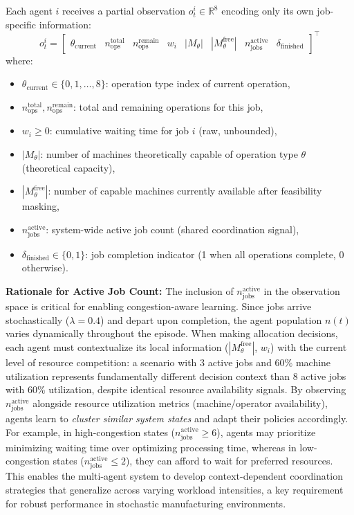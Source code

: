 Each agent \( i \) receives a partial observation \( o_t^i \in \mathbb{R}^8 \) encoding only its own job-specific information:
\begin{equation}
o_t^i = \begin{bmatrix}
\theta_{\text{current}} & n_{\text{ops}}^{\text{total}} & n_{\text{ops}}^{\text{remain}} & w_i & |M_\theta| & |M_{\theta}^{\text{free}}| & n_{\text{jobs}}^{\text{active}} & \delta_{\text{finished}}
\end{bmatrix}^\top
\end{equation}
where:
\begin{itemize}
    \item \( \theta_{\text{current}} \in \{0, 1, \ldots, 8\} \): operation type index of current operation,
    \item \( n_{\text{ops}}^{\text{total}}, n_{\text{ops}}^{\text{remain}} \): total and remaining operations for this job,
    \item \( w_i \geq 0 \): cumulative waiting time for job \( i \) (raw, unbounded),
    \item \( |M_\theta| \): number of machines theoretically capable of operation type \( \theta \) (theoretical capacity),
    \item \( |M_{\theta}^{\text{free}}| \): number of capable machines currently available after feasibility masking,
    \item \( n_{\text{jobs}}^{\text{active}} \): system-wide active job count (shared coordination signal),
    \item \( \delta_{\text{finished}} \in \{0,1\} \): job completion indicator (1 when all operations complete, 0 otherwise).
\end{itemize}

\textbf{Rationale for Active Job Count:} The inclusion of \( n_{\text{jobs}}^{\text{active}} \) in the observation space is critical for enabling congestion-aware learning. Since jobs arrive stochastically (\(\lambda = 0.4\)) and depart upon completion, the agent population \( n(t) \) varies dynamically throughout the episode. When making allocation decisions, each agent must contextualize its local information (\( |M_{\theta}^{\text{free}}| \), \( w_i \)) with the current level of resource competition: a scenario with 3 active jobs and 60\% machine utilization represents fundamentally different decision context than 8 active jobs with 60\% utilization, despite identical resource availability signals. By observing \( n_{\text{jobs}}^{\text{active}} \) alongside resource utilization metrics (machine/operator availability), agents learn to \textit{cluster similar system states} and adapt their policies accordingly. For example, in high-congestion states (\( n_{\text{jobs}}^{\text{active}} \geq 6 \)), agents may prioritize minimizing waiting time over optimizing processing time, whereas in low-congestion states (\( n_{\text{jobs}}^{\text{active}} \leq 2 \)), they can afford to wait for preferred resources. This enables the multi-agent system to develop context-dependent coordination strategies that generalize across varying workload intensities, a key requirement for robust performance in stochastic manufacturing environments.

